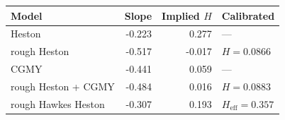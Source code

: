 \begin{tabular}{lrrl}
\toprule
Model & Slope & Implied $H$ & Calibrated\\
\midrule
Heston & -0.223 & 0.277 & ---\\
rough Heston & -0.517 & -0.017 & $H = 0.0866$\\
CGMY & -0.441 & 0.059 & ---\\
rough Heston + CGMY & -0.484 & 0.016 & $H = 0.0883$\\
rough Hawkes Heston & -0.307 & 0.193 & $H_{\mathrm{eff}} = 0.357$\\
\bottomrule
\end{tabular}
